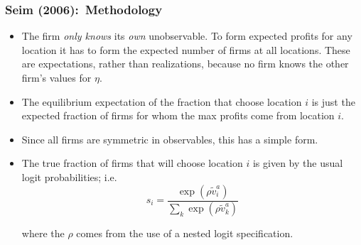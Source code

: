 \documentclass[notes=show]{beamer}
\begin{document}
\begin{frame}%

\frametitle{Seim (2006):\ Methodology}

\begin{itemize}
\item The firm \textit{only knows} its \textit{own} unobservable. To form
expected profits for any location it has to form the expected number of
firms at all locations. These are expectations, rather than realizations,
because no firm knows the other firm's values for $\eta $.

\item The equilibrium expectation of the fraction that choose location $i$
is just the expected fraction of firms for whom the max profits come from
location $i.$

\item Since all firms are symmetric in observables, this has a simple form.

\item The true fraction of firms that will choose location $i$ is given by
the usual logit probabilities; i.e. 
\begin{equation*}
s_{i}=\frac{\exp (\rho \tilde{v}_{i}^{a})}{\sum_{k}\exp (\rho \tilde{v}%
_{k}^{a})}
\end{equation*}

where the $\rho $ comes from the use of a nested logit specification.
\end{itemize}

\end{frame}%
\end{document}
